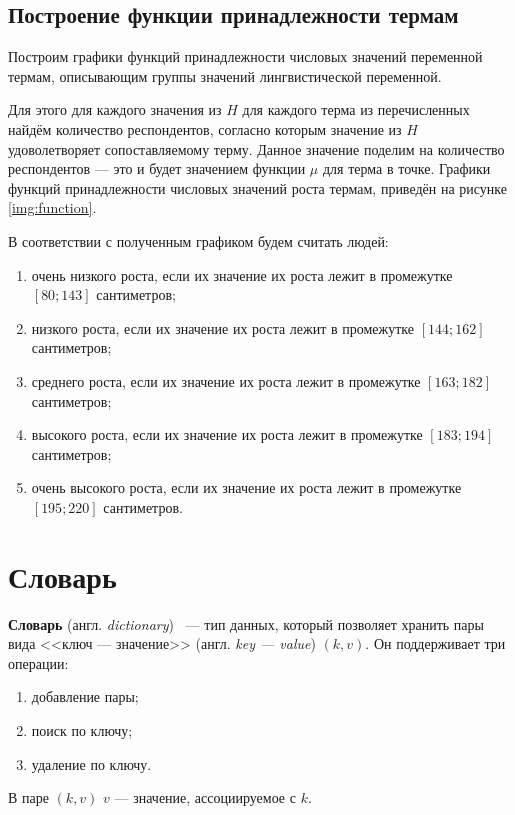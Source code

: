 \subsection{Построение функции принадлежности термам}

Построим графики функций принадлежности числовых значений переменной термам, описывающим группы значений лингвистической переменной.

Для этого для каждого значения из $H$ для каждого терма из перечисленных найдём количество респондентов, согласно которым значение из $H$ удоволетворяет сопоставляемому терму.
Данное значение поделим на количество респондентов --- это и будет значением функции $\mu$ для терма в точке.
Графики функций принадлежности числовых значений роста термам, приведён на рисунке \ref{img:function}.
	


В соответствии с полученным графиком будем считать людей:
\begin{enumerate}[label=\arabic*)]
	\item очень низкого роста, если их значение их роста лежит в промежутке $[80; 143]$ сантиметров;
	\item низкого роста, если их значение их роста лежит в промежутке $[144; 162]$ сантиметров;
	\item среднего роста, если их значение их роста лежит в промежутке $[163; 182]$ сантиметров;
	\item высокого роста, если их значение их роста лежит в промежутке $[183; 194]$ сантиметров;
	\item очень высокого роста, если их значение их роста лежит в промежутке $[195; 220]$ сантиметров.
\end{enumerate}

\section{Словарь}

\textbf{Словарь} (англ. \textit{dictionary})~\cite{dict} --- тип данных, который позволяет хранить пары вида <<ключ  --- значение>> (англ. \textit{key --- value}) $(k, v)$. Он поддерживает три операции:
\begin{enumerate}[label=\arabic*)]
	\item добавление пары;
	\item поиск по ключу;
	\item удаление по ключу.
\end{enumerate}
В паре $(k, v)$ $v$ --- значение, ассоциируемое с $k$.

